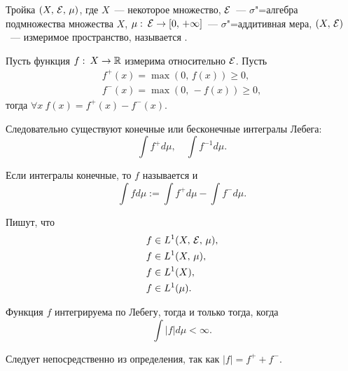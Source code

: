\newpage
{}

\begin{definition}
    Тройка $(X,\, \mathcal{E},\, \mu)$, где $X$~--- некоторое множество,
    $\mathcal{E}$~--- $\sigma$"=алгебра подмножества множества $X$,
    $\mu:\:\mathcal{E}\to[0,\,+\infty]$~--- $\sigma$"=аддитивная мера,
    $(X,\, \mathcal{E})$~--- измеримое пространство, называется
    .
\end{definition}

\begin{definition}
    Пусть функция $f:\: X\to\mathbb{R}$ измерима относительно $\mathcal{E}$.
    Пусть \begin{align*}
        f^{+}(x)=\max(0,\, f(x))\geqslant 0, \\
        f^{-}(x)=\max(0,\, -f(x))\geqslant 0,
    \end{align*}
    тогда $\forall x\ f(x)=f^+(x)-f^{-}(x)$.

    Следовательно существуют конечные или бесконечные интегралы Лебега:
    \[
        \int f^{+}d\mu,\quad \int f^{-1}d\mu.
    \]

    Если интегралы конечные, то $f$ называется  и \[
        \int fd\mu:=\int f^{+}d\mu-\int f^{-}d\mu.
    \]

    Пишут, что \begin{align*}
        f & \in L^{1}(X,\, \mathcal{E},\, \mu), \\
        f & \in L^{1}(X,\, \mu),        \\
        f & \in L^{1}(X),               \\
        f & \in L^{1}(\mu).
    \end{align*}
\end{definition}

\begin{remark}
    Функция $f$ интегрируема по Лебегу, тогда и только тогда, когда \[
        \int |f|d\mu<\infty.
    \]

    Следует непосредственно из определения, так как $|f|=f^{+}+f^{-}$.
\end{remark}

